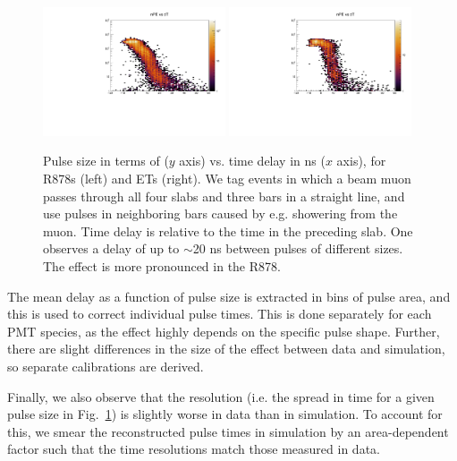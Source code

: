 {\begin{figure}[t] 
  \begin{center}
    \includegraphics[width=0.48\textwidth]{figs/milliq/npe_vs_dt_878.pdf}
    \includegraphics[width=0.48\textwidth]{figs/milliq/npe_vs_dt_ET.pdf}
    \caption{Pulse size in terms of \Npe ($y$ axis) vs. time delay in ns ($x$ axis),
      for R878s (left) and ETs (right). We tag events in which a beam muon 
      passes through all four slabs and three bars in a straight line, and use pulses
      in neighboring bars caused by e.g. showering from the muon. Time delay is relative
      to the time in the preceding slab. One observes a delay of up to $\sim$20 ns
      between pulses of different sizes. The effect is more pronounced in the R878.
            }
    \label{fig:mq_time_walk}
  \end{center}
\end{figure}

The mean delay as a function of pulse size is extracted in bins of pulse area, and this is used
to correct individual pulse times. This is done separately for each PMT species, as the effect
highly depends on the specific pulse shape. Further, there are slight differences in the size
of the effect between data and simulation, so separate calibrations are derived.

Finally, we also observe that the resolution (i.e. the spread in time for a given pulse size
in Fig.~\ref{fig:mq_time_walk}) is slightly worse in data than in simulation. To account for 
this, we smear the reconstructed pulse times in simulation by an area-dependent factor such
that the time resolutions match those measured in data.

}

